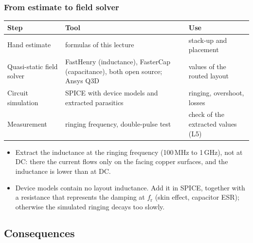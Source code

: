 \begin{frame}
	\frametitle{From estimate to field solver}
	\begin{table}
		\centering
		\small
		\begin{tabular}{|>{\raggedright\arraybackslash}p{3.0cm}|>{\raggedright\arraybackslash}p{4.6cm}|>{\raggedright\arraybackslash}p{4.8cm}|}
			\hline
			\textbf{Step}                & \textbf{Tool}                                             & \textbf{Use}                                                   \\
			\hline
			Hand estimate                & formulas of this lecture                                  & stack-up and placement                                         \\
			Quasi-static field solver    & FastHenry (inductance), FasterCap (capacitance), both open source; Ansys Q3D & values of the routed layout              \\
			Circuit simulation           & SPICE with device models and extracted parasitics         & ringing, overshoot, losses                                     \\
			Measurement                  & ringing frequency, double-pulse test                      & check of the extracted values (L5)                             \\
			\hline
		\end{tabular}
	\end{table}
	\begin{itemize}
		\item Extract the inductance at the ringing frequency (100\,MHz to 1\,GHz), not at DC: there the current flows only on the facing copper surfaces, and the inductance is lower than at DC.
		\item Device models contain no layout inductance. Add it in SPICE, together with a resistance that represents the damping at $f_\mathrm{r}$ (skin effect, capacitor ESR); otherwise the simulated ringing decays too slowly.
	\end{itemize}
\end{frame}

\subsection{Consequences}

